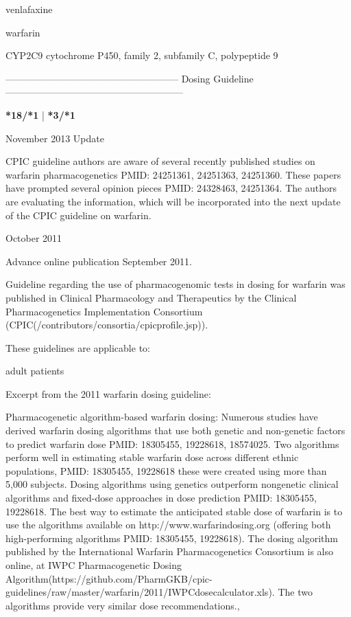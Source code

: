 \documentclass{resume} %
\begin{document}
\begin{rSection}{ venlafaxine }
\end{rSection}\begin{rSection}{ warfarin }
\item[]
\begin{rSubsection}{ CYP2C9 }{ cytochrome P450, family 2, subfamily C, polypeptide 9 }{}{}
\item[]
\item[] ------------------------------------------------------ Dosing Guideline --------------------------------------------------------\newline
\item[]
\item[] \textbf{ *18/*1 } | \textbf{ *3/*1 }
\item November 2013 Update
 \newline
\item CPIC guideline authors are aware of several recently published studies on warfarin pharmacogenetics PMID: 24251361, 24251363, 24251360. These papers have prompted several opinion pieces PMID: 24328463, 24251364. The authors are evaluating the information, which will be incorporated into the next update of the CPIC guideline on warfarin.
 \newline
\item October 2011
 \newline
\item Advance online publication September 2011. 
 \newline
\item Guideline regarding the use of pharmacogenomic tests in dosing for warfarin was published in Clinical Pharmacology and Therapeutics by the Clinical Pharmacogenetics Implementation Consortium (CPIC(/contributors/consortia/cpicprofile.jsp)).  
 \newline
\item These guidelines are applicable to:
 \newline
\item adult patients
 \newline
\item Excerpt from the 2011 warfarin dosing guideline:
 \newline
\item Pharmacogenetic algorithm-based warfarin dosing: Numerous studies have derived warfarin dosing algorithms that use both genetic and non-genetic factors to predict warfarin dose PMID: 18305455, 19228618, 18574025. Two algorithms perform well in estimating stable warfarin dose across different ethnic populations,  PMID: 18305455, 19228618 these were created using more than 5,000 subjects. Dosing algorithms using genetics outperform nongenetic clinical algorithms and fixed-dose approaches in dose prediction PMID: 18305455, 19228618. The best way to estimate the anticipated stable dose of warfarin is to use the algorithms available on http://www.warfarindosing.org (offering both high-performing algorithms PMID: 18305455, 19228618). The dosing algorithm published by the International Warfarin Pharmacogenetics Consortium is also online, at IWPC Pharmacogenetic Dosing Algorithm(https://github.com/PharmGKB/cpic-guidelines/raw/master/warfarin/2011/IWPCdosecalculator.xls). The two algorithms provide very similar dose recommendations., 

\end{rSubsection}
\end{rSection}
\end{document}
